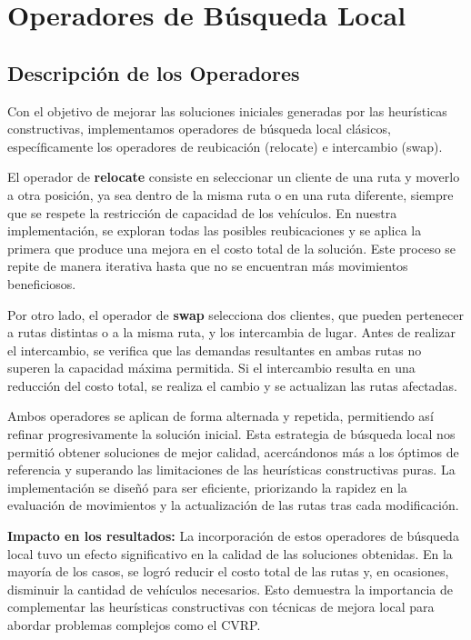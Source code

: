 \documentclass[a4paper,12pt]{article}
\begin{document}
\section{Operadores de Búsqueda Local}
\subsection{Descripción de los Operadores}

Con el objetivo de mejorar las soluciones iniciales generadas por las heurísticas constructivas, implementamos operadores de búsqueda local clásicos, específicamente los operadores de reubicación (relocate) e intercambio (swap).

El operador de \textbf{relocate} consiste en seleccionar un cliente de una ruta y moverlo a otra posición, ya sea dentro de la misma ruta o en una ruta diferente, siempre que se respete la restricción de capacidad de los vehículos. En nuestra implementación, se exploran todas las posibles reubicaciones y se aplica la primera que produce una mejora en el costo total de la solución. Este proceso se repite de manera iterativa hasta que no se encuentran más movimientos beneficiosos.

Por otro lado, el operador de \textbf{swap} selecciona dos clientes, que pueden pertenecer a rutas distintas o a la misma ruta, y los intercambia de lugar. Antes de realizar el intercambio, se verifica que las demandas resultantes en ambas rutas no superen la capacidad máxima permitida. Si el intercambio resulta en una reducción del costo total, se realiza el cambio y se actualizan las rutas afectadas.

Ambos operadores se aplican de forma alternada y repetida, permitiendo así refinar progresivamente la solución inicial. Esta estrategia de búsqueda local nos permitió obtener soluciones de mejor calidad, acercándonos más a los óptimos de referencia y superando las limitaciones de las heurísticas constructivas puras. La implementación se diseñó para ser eficiente, priorizando la rapidez en la evaluación de movimientos y la actualización de las rutas tras cada modificación.

\textbf{Impacto en los resultados:} La incorporación de estos operadores de búsqueda local tuvo un efecto significativo en la calidad de las soluciones obtenidas. En la mayoría de los casos, se logró reducir el costo total de las rutas y, en ocasiones, disminuir la cantidad de vehículos necesarios. Esto demuestra la importancia de complementar las heurísticas constructivas con técnicas de mejora local para abordar problemas complejos como el CVRP.
\end{document}
